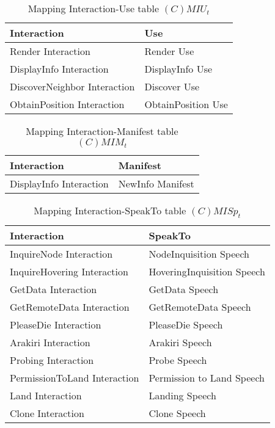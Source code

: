 \begin{table}[H]
	\centering
	\begin{tabular}{|p{4cm}|p{8cm}|}
			\hline
			\textbf{Interaction} & \textbf{Use} \\
			\hline
			Render Interaction & Render Use\\
			\hline
			DisplayInfo Interaction & DisplayInfo Use\\
			\hline
      DiscoverNeighbor Interaction & Discover Use \\
			\hline
      ObtainPosition Interaction & ObtainPosition Use \\
			\hline
		\end{tabular}
	\caption{Mapping Interaction-Use table $(C)MIU_t$}
	\label{tab:cmiut}
\end{table}

\begin{table}[H]
	\centering
	\begin{tabular}{|p{4cm}|p{8cm}|}
			\hline
			\textbf{Interaction} & \textbf{Manifest} \\
			\hline
			DisplayInfo Interaction & NewInfo Manifest \\
			\hline
		\end{tabular}
	\caption{Mapping Interaction-Manifest table $(C)MIM_t$}
	\label{tab:cmimt}
\end{table}

\begin{table}[H]
	\centering
	\begin{tabular}{|p{4cm}|p{8cm}|}
			\hline
			\textbf{Interaction} & \textbf{SpeakTo} \\
			\hline
			InquireNode Interaction & NodeInquisition Speech \\
			\hline
      InquireHovering Interaction & HoveringInquisition Speech  \\
			\hline
			GetData Interaction & GetData Speech\\
			\hline
      GetRemoteData Interaction & GetRemoteData Speech \\
			\hline
			PleaseDie Interaction & PleaseDie Speech \\
			\hline
			Arakiri Interaction & Arakiri Speech \\
			\hline
      Probing Interaction & Probe Speech \\
			\hline
      PermissionToLand Interaction & Permission to Land Speech \\
			\hline
      Land Interaction & Landing Speech \\
			\hline
      Clone Interaction & Clone Speech \\
			\hline
		\end{tabular}
	\caption{Mapping Interaction-SpeakTo table $(C)MISp_t$}
	\label{tab:cmispt}
\end{table}

